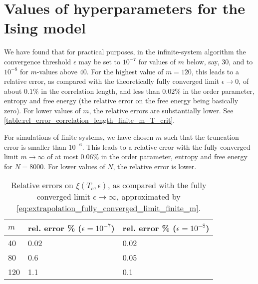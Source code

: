 \section{Values of hyperparameters for the Ising model}
We have found that for practical purposes, in the infinite-system algorithm the convergence threshold $\epsilon$ may be
set to $10^{-7}$ for values of $m$ below, say, 30, and to $10^{-8}$ for $m$-values above 40.
For the highest value of $m = 120$, this leads to a relative error,
as compared with the theoretically fully converged limit $\epsilon \to 0$,
of about $0.1\%$ in the correlation length, and less than $0.02\%$ in the order parameter,
entropy and free energy (the relative error on the free energy being basically zero).
For lower values of $m$, the relative errors are substantially lower.
See \autoref{table:rel_error_correlation_length_finite_m_T_crit}.


For simulations of finite systems, we have chosen $m$ such that the truncation error is smaller than $10^{-6}$.
This leads to a relative error with the fully converged limit $m \to \infty$ of at most $0.06\%$ in the order parameter,
entropy and free energy for $N = 8000$. For lower values of $N$, the relative error is lower.

\begin{table}[]
\centering
\begin{tabular}{@{}lll@{}}
$m$ & rel. error \% ($\epsilon = 10^{-7}$) & rel. error \% ($\epsilon = 10^{-8}$) \\ \midrule
40  & 0.02                              & 0.02                              \\
80  & 0.6                               & 0.05                              \\
120 & 1.1                               & 0.1                               \\ \bottomrule
\end{tabular}
\caption{Relative errors on $\xi(T_c, \epsilon)$, as compared with the fully converged limit $\epsilon \to \infty$,
approximated by
\autoref{eq:extrapolation_fully_converged_limit_finite_m}.}\label{table:rel_error_correlation_length_finite_m_T_crit}
\end{table}
